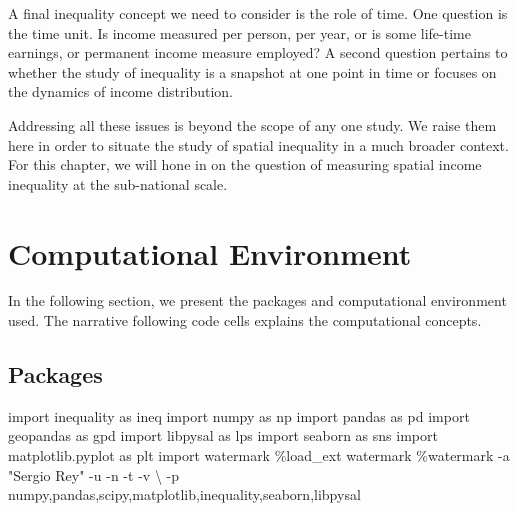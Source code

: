 \documentclass[
  a4paper, 
  twoside,
  final
]{article}
\newenvironment{Shaded}{\begin{snugshade}}{\end{snugshade}}
\newcommand{\ImportTok}[1]{\textcolor[rgb]{0.00,0.46,0.62}{#1}}
\newcommand{\NormalTok}[1]{\textcolor[rgb]{0.00,0.23,0.31}{#1}}
\newcommand{\OperatorTok}[1]{\textcolor[rgb]{0.37,0.37,0.37}{#1}}
\newcommand{\StringTok}[1]{\textcolor[rgb]{0.13,0.47,0.30}{#1}}
\newcommand*\circled[1]{\tikz[baseline=(char.base)]{
          \node[shape=circle,draw,inner sep=1pt] (char) {{\scriptsize#1}};}}
\newcounter{code}
\begin{document}
A final inequality concept we need to consider is the role of time. One
question is the time unit. Is income measured per person, per year, or
is some life-time earnings, or permanent income
\citep{hall1978StochasticImplications} measure employed? A second
question pertains to whether the study of inequality is a snapshot at
one point in time or focuses on the dynamics of income distribution.

Addressing all these issues is beyond the scope of any one study. We
raise them here in order to situate the study of spatial inequality in a
much broader context. For this chapter, we will hone in on the question
of measuring spatial income inequality at the sub-national scale.

\section{Computational Environment}\label{computational-environment}

In the following section, we present the packages and computational
environment used. The narrative following code cells explains the
computational concepts.

\subsection{Packages}\label{packages}

\label{annotated-cell-1}%
\begin{Shaded}
\begin{Highlighting}[]
\ImportTok{import}\NormalTok{ inequality }\ImportTok{as}\NormalTok{ ineq }\hspace*{\fill}\NormalTok{\circled{1}}
\ImportTok{import}\NormalTok{ numpy }\ImportTok{as}\NormalTok{ np }\hspace*{\fill}\NormalTok{\circled{2}}
\ImportTok{import}\NormalTok{ pandas }\ImportTok{as}\NormalTok{ pd}
\ImportTok{import}\NormalTok{ geopandas }\ImportTok{as}\NormalTok{ gpd}
\ImportTok{import}\NormalTok{ libpysal }\ImportTok{as}\NormalTok{ lps}
\ImportTok{import}\NormalTok{ seaborn }\ImportTok{as}\NormalTok{ sns}
\ImportTok{import}\NormalTok{ matplotlib.pyplot }\ImportTok{as}\NormalTok{ plt}
\ImportTok{import}\NormalTok{ watermark }\hspace*{\fill}\NormalTok{\circled{3}}
\OperatorTok{\%}\NormalTok{load\_ext watermark                     }
\OperatorTok{\%}\NormalTok{watermark }\OperatorTok{{-}}\NormalTok{a }\StringTok{"Sergio Rey"} \OperatorTok{{-}}\NormalTok{u }\OperatorTok{{-}}\NormalTok{n }\OperatorTok{{-}}\NormalTok{t }\OperatorTok{{-}}\NormalTok{v }\OperatorTok{\textbackslash{}}
    \OperatorTok{{-}}\NormalTok{p numpy,pandas,scipy,matplotlib,inequality,seaborn,libpysal}
\end{Highlighting}
\end{Shaded}
\end{document}
